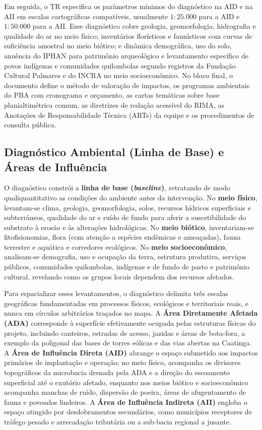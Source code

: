 Em seguida, o TR especifica os parâmetros mínimos do diagnóstico na AID e na AII em escalas cartográficas compatíveis, usualmente $1{:}25.000$ para a AID e $1{:}50.000$ para a AII. Esse diagnóstico cobre geologia, geomorfologia, hidrografia e qualidade do ar no meio físico; inventários florísticos e faunísticos com curvas de suficiência amostral no meio biótico; e dinâmica demográfica, uso do solo, anuência do IPHAN para patrimônio arqueológico e levantamento específico de povos indígenas e comunidades quilombolas segundo registros da Fundação Cultural Palmares e do INCRA no meio socioeconômico. No bloco final, o documento define o método de valoração de impactos, os programas ambientais do PBA com cronograma e orçamento, as cartas temáticas sobre base planialtimétrica comum, as diretrizes de redação acessível do RIMA, as Anotações de Responsabilidade Técnica (ARTs) da equipe e os procedimentos de consulta pública.

\subsection{Diagnóstico Ambiental (Linha de Base) e Áreas de Influência}

O diagnóstico constrói a \textbf{linha de base (\textit{baseline})}, retratando de modo qualiquantitativo as condições do ambiente antes da intervenção. No \textbf{meio físico}, levantam-se clima, geologia, geomorfologia, solos, recursos hídricos superficiais e subterrâneos, qualidade do ar e ruído de fundo para aferir a suscetibilidade do substrato à erosão e às alterações hidrológicas. No \textbf{meio biótico}, inventariam-se fitofisionomias, flora (com atenção a espécies endêmicas e ameaçadas), fauna terrestre e aquática e corredores ecológicos. No \textbf{meio socioeconômico}, analisam-se demografia, uso e ocupação da terra, estrutura produtiva, serviços públicos, comunidades quilombolas, indígenas e de fundo de pasto e patrimônio cultural, revelando como os grupos locais dependem dos recursos afetados.

Para espacializar esses levantamentos, o diagnóstico delimita três escalas geográficas fundamentadas em processos físicos, ecológicos e territoriais reais, e nunca em círculos arbitrários traçados no mapa. A \textbf{Área Diretamente Afetada (ADA)} corresponde à superfície efetivamente ocupada pelas estruturas físicas do projeto, incluindo canteiros, estradas de acesso, jazidas e áreas de bota-fora, a exemplo da poligonal das bases de torres eólicas e das vias abertas na Caatinga. A \textbf{Área de Influência Direta (AID)} abrange o espaço submetido aos impactos primários de implantação e operação; no meio físico, acompanha os divisores topográficos da microbacia drenada pela ADA e a direção do escoamento superficial até o exutório afetado, enquanto nos meios biótico e socioeconômico acompanha manchas de ruído, dispersão de poeira, áreas de afugentamento de fauna e povoados lindeiros. A \textbf{Área de Influência Indireta (AII)} engloba o espaço atingido por desdobramentos secundários, como municípios receptores de tráfego pesado e arrecadação tributária ou a sub-bacia regional a jusante.

